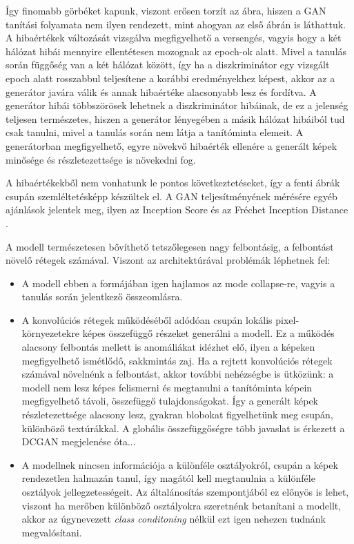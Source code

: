 Így finomabb görbéket kapunk, viszont erősen torzít az ábra, hiszen a GAN tanítási folyamata nem ilyen rendezett, mint ahogyan az első ábrán is láthattuk.
A hibaértékek változását vizsgálva megfigyelhető a versengés, vagyis hogy a két hálózat hibái mennyire ellentétesen mozognak az epoch-ok alatt. Mivel a tanulás során függőség van a két hálózat között, így ha a diszkriminátor egy vizsgált epoch alatt rosszabbul teljesítene a korábbi eredményekhez képest, akkor az a generátor javára válik és annak hibaértéke alacsonyabb lesz és fordítva. A generátor hibái többszörösek lehetnek a diszkriminátor hibáinak, de ez a jelenség teljesen természetes, hiszen a generátor lényegében a másik hálózat hibáiból tud csak tanulni, mivel a tanulás során nem látja a tanítóminta elemeit. A generátorban megfigyelhető, egyre növekvő hibaérték ellenére a generált képek minősége és részletezettsége is növekedni fog.

A hibaértékekből nem vonhatunk le pontos következtetéseket, így a fenti ábrák csupán szemléltetésképp készültek el. A GAN teljesítményének mérésére egyéb ajánlások jelentek meg, ilyen az Inception Score \cite{salimans2016improved} és az Fréchet Inception Distance \cite{heusel2017gans}.


A modell természetesen bővíthető tetszőlegesen nagy felbontásig, a felbontást növelő rétegek számával. Viszont az architektúrával problémák léphetnek fel:
\begin{itemize}
	\item A modell ebben a formájában igen hajlamos az mode collapse-re, vagyis a tanulás során jelentkező összeomlásra.
	\item A konvolúciós rétegek működéséből adódóan csupán lokális pixel-környezetekre képes összefüggő részeket generálni a modell.
	Ez a működés alacsony felbontás mellett is anomáliákat idézhet elő, ilyen a képeken megfigyelhető ismétlődő, sakkmintás zaj. Ha a rejtett konvolúciós rétegek számával növelnénk a felbontást, akkor további nehézségbe is ütközünk: a modell nem lesz képes felismerni és megtanulni a tanítóminta képein megfigyelhető távoli, összefüggő tulajdonságokat. Így a generált képek részletezettsége alacsony lesz, gyakran blobokat figyelhetünk meg csupán, különböző textúrákkal. A globális összefüggőségre több javaslat is érkezett a DCGAN megjelenése óta...
	\item A modellnek nincsen információja a különféle osztályokról, csupán a képek rendezetlen halmazán tanul, így magától kell megtanulnia a különféle osztályok jellegzetességeit.
	Az általánosítás szempontjából ez előnyös is lehet, viszont ha merőben különböző osztályokra szeretnénk betanítani a modellt, akkor az úgynevezett \textit{class conditoning} nélkül ezt igen nehezen tudnánk megvalósítani.
\end{itemize}

